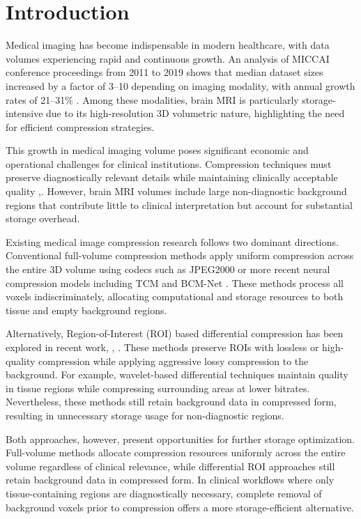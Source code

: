 \documentclass[runningheads]{llncs}
\begin{document}
\section{Introduction}

Medical imaging has become indispensable in modern healthcare, with data volumes experiencing rapid and continuous growth. An analysis of MICCAI conference proceedings from 2011 to 2019 shows that median dataset sizes increased by a factor of 3--10 depending on imaging modality, with annual growth rates of 21--31\% \cite{Kiryati2021}. Among these modalities, brain MRI is particularly storage-intensive due to its high-resolution 3D volumetric nature, highlighting the need for efficient compression strategies. 

This growth in medical imaging volume poses significant economic and operational challenges for clinical institutions. Compression techniques must preserve diagnostically relevant details while maintaining clinically acceptable quality \cite{Tong2025},\cite{Ig2017}. However, brain MRI volumes include large non-diagnostic background regions that contribute little to clinical interpretation but account for substantial storage overhead. 

Existing medical image compression research follows two dominant directions. Conventional full-volume compression methods apply uniform compression across the entire 3D volume using codecs such as JPEG2000 \cite{jpeg} or more recent neural compression models including TCM \cite{tcm} and BCM-Net \cite{bcm}. These methods process all voxels indiscriminately, allocating computational and storage resources to both tissue and empty background regions. 

Alternatively, Region-of-Interest (ROI) based differential compression has been explored in recent work, \cite{Li2025}, \cite{Tong2025}. These methods preserve ROIs with lossless or high-quality compression while applying aggressive lossy compression to the background. For example, wavelet-based differential techniques \cite{Rosaline2024} maintain quality in tissue regions while compressing surrounding areas at lower bitrates. Nevertheless, these methods still retain background data in compressed form, resulting in unnecessary storage usage for non-diagnostic regions. 

Both approaches, however, present opportunities for further storage optimization. Full-volume methods allocate compression resources uniformly across the entire volume regardless of clinical relevance, while differential ROI approaches still retain background data in compressed form. In clinical workflows where only tissue-containing regions are diagnostically necessary, complete removal of background voxels prior to compression offers a more storage-efficient alternative.
\end{document}
